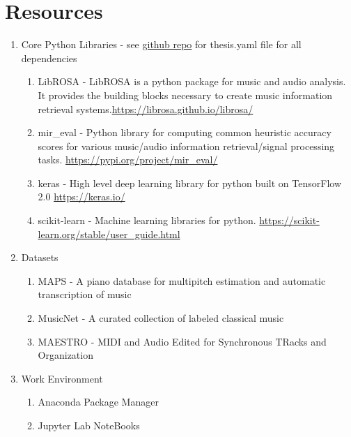 \section{Resources}

\begin{enumerate}
      \item Core Python Libraries - see
            \href{https://github.com/OliverIgnetik/engn4200_thesis}{github repo}
            for thesis.yaml file for all dependencies
            \begin{enumerate}
                  \item LibROSA - LibROSA is a python package for music and audio analysis. It provides the building blocks necessary to create music information retrieval systems.\newline \url{https://librosa.github.io/librosa/}
                  \item mir\_eval -  Python library for computing common heuristic accuracy scores for various music/audio information retrieval/signal processing tasks. \newline \url{https://pypi.org/project/mir_eval/}
                  \item keras - High level deep learning library for python built on TensorFlow 2.0 \newline \url{https://keras.io/}
                  \item scikit-learn -  Machine learning libraries for python. \newline \url{https://scikit-learn.org/stable/user_guide.html}
            \end{enumerate}
      \item Datasets
            \begin{enumerate}
                  \item MAPS - A piano database for multipitch estimation and automatic
                        transcription of music \cite{MAPS:Emiya}
                  \item MusicNet - A curated collection of labeled classical music \cite{thickstun2018invariances}
                  \item MAESTRO - MIDI and Audio Edited for Synchronous TRacks and
                        Organization \cite{hawthorne2018enabling}
            \end{enumerate}

      \item Work Environment
            \begin{enumerate}
                  \item Anaconda Package Manager
                  \item Jupyter Lab NoteBooks
            \end{enumerate}
\end{enumerate}
